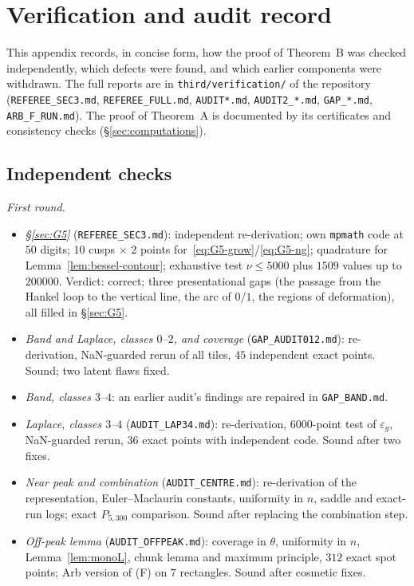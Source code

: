 \section{Verification and audit record}\label{app:verification}

This appendix records, in concise form, how the proof of Theorem~B was checked independently, which defects were found,
and which earlier components were withdrawn. The full reports are in \texttt{third/verification/} of the repository
(\texttt{REFEREE\_SEC3.md}, \texttt{REFEREE\_FULL.md}, \texttt{AUDIT*.md}, \texttt{AUDIT2\_*.md}, \texttt{GAP\_*.md},
\texttt{ARB\_F\_RUN.md}). The proof of Theorem~A is documented by its certificates and consistency checks
(\S\ref{sec:computations}).

\subsection{Independent checks}

\emph{First round.}
\begin{itemize}
\item \emph{\S\ref{sec:G5}} (\texttt{REFEREE\_SEC3.md}): independent re-derivation; own \texttt{mpmath} code at $50$ digits;
$10$ cusps $\times$ $2$ points for~\eqref{eq:G5-grow}/\eqref{eq:G5-ng}; quadrature for Lemma~\ref{lem:bessel-contour};
exhaustive test $\nu\le5000$ plus $1509$ values up to $200000$. Verdict: correct; three presentational gaps (the passage
from the Hankel loop to the vertical line, the arc of $0/1$, the regions of deformation), all filled in \S\ref{sec:G5}.
\item \emph{Band and Laplace, classes $0$--$2$, and coverage} (\texttt{GAP\_AUDIT012.md}): re-derivation, NaN-guarded
rerun of all tiles, $45$ independent exact points. Sound; two latent flaws fixed.
\item \emph{Band, classes $3$--$4$}: an earlier audit's findings are repaired in \texttt{GAP\_BAND.md}.
\item \emph{Laplace, classes $3$--$4$} (\texttt{AUDIT\_LAP34.md}): re-derivation, $6000$-point test of $\varepsilon_g$,
NaN-guarded rerun, $36$ exact points with independent code. Sound after two fixes.
\item \emph{Near peak and combination} (\texttt{AUDIT\_CENTRE.md}): re-derivation of the representation, Euler--Maclaurin
constants, uniformity in $n$, saddle and exact-run logs; exact $P_{5,300}$ comparison. Sound after replacing the
combination step.
\item \emph{Off-peak lemma} (\texttt{AUDIT\_OFFPEAK.md}): coverage in $\theta$, uniformity in $n$,
Lemma~\ref{lem:monoL}, chunk lemma and maximum principle, $312$ exact spot points; Arb version of (F) on $7$ rectangles.
Sound after cosmetic fixes.
\end{itemize}

